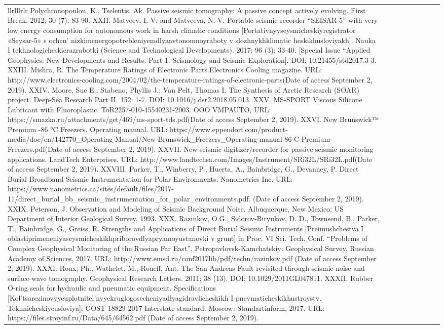 \begin{longtable}{lllllllll}{llrlllrlr}
Polychronopoulou, K., Tselentis, Ak. Passive seismic tomography: A passive concept actively evolving. First Break. 2012; 30 (7): 83-90. XXII. Matveev, I. V. and Matveeva, N. V. Portable seismic recorder “SEISAR-5” with very low energy consumption for autonomous work in harsh climatic conditions [Portativnyyseysmicheskiyregistrator «Seysar-5» s ochen’ nizkimenergopotrebleniyemdlyaavtonomnoyraboty v slozhnykhklimatic heskikhusloviyakh]. Nauka I tekhnologicheskierazrabotki (Science and Technological Developments). 2017; 96 (3): 33-40. [Special Issue “Applied Geophysics: New Developments and Results. Part 1. Seismology and Seismic Exploration]. DOI: 10.21455/std2017.3-3.  XXIII. Mishra, R. The Temperature Ratings of Electronic Parts.Electronics Cooling magazine. URL: http://www.electronics-cooling.com/2004/02/the-temperature-ratings-of-electronic-parts(Date of access September 2, 2019).  XXIV. Moore, Sue E.; Stabeno, Phyllis J.; Van Pelt, Thomas I. The Synthesis of Arctic Research (SOAR) project. Deep-Sea Research Part II. 152: 1-7. DOI: 10.1016/j.dsr2.2018.05.013.  XXV. MS-SPORT Viscous Silicone Lubricant with Fluoroplastic. ToR2257-010-45540231-2003. OOO VMPAUTO, URL: https://smazka.ru/attachments/get/469/ms-sport-tds.pdf(Date of access September 2, 2019).  XXVI. New Brunswick™ Premium -86 °C Freezers. Operating manual. URL: https://www.eppendorf.com/product-media/doc/en/142770_Operating-Manual/New-Brunswick_Freezers_Operating-manual-86-C-Premium-Freezers.pdf(Date of access September 2, 2019).  XXVII. New seismic digitizer/recorder for passive seismic monitoring applications. LandTech Enterprises. URL: http://www.landtechsa.com/Images/Instrument/SRi32L/SRi32L.pdf(Date of access September 2, 2019).  XXVIII. Parker, T., Winberry, P., Huerta, A., Bainbridge, G., Devanney, P. Direct Burial Broadband Seismic Instrumentation for Polar Environments. Nanometrics Inc. URL: https://www.nanometrics.ca/sites/default/files/2017-11/direct_burial_bb_seismic_instrumentation_for_polar_environments.pdf. (Date of access September 2, 2019).  XXIX. Peterson, J. Observation and Modeling of Seismic Background Noise. Albuquerque, New Mexico: US Department of Interior Geological Survey, 1993.  XXX. Razinkov, O.G., Sidorov-Biryukov, D. D., Townsend, B., Parker, T., Bainbridge, G., Greiss, R. Strengths and Applications of Direct Burial Seismic Instruments [Preimushchestva I oblastiprimeneniyaseysmicheskikhpriborovdlyapryamoyustanovki v grunt] in Proc. VI Sci. Tech. Conf. “Problems of Complex Geophysical Monitoring of the Russian Far East”, Petropavlovsk-Kamchatskiy: Geophysical Survey, Russian Academy of Sciences, 2017. URL: http://www.emsd.ru/conf2017lib/pdf/techn/razinkov.pdf (Date of access September 2, 2019).  XXXI. Roux, Ph., Wathelet, M., Roueff, Ant. The San Andreas Fault revisited through seismic-noise and surface-wave tomography. Geophysical Research Letters. 2011; 38 (13). DOI: 10.1029/2011GL047811.  XXXII. Rubber O-ring seals for hydraulic and pneumatic equipment. Specifications [Kol’tsarezinovyyeuplotnitel’nyyekruglogosecheniyadlyagidravlicheskikh I pnevmaticheskikhustroystv. Tekhnicheskiyeusloviya]. GOST 18829-2017 Interstate standard. Moscow: Standartinform, 2017. URL: https://files.stroyinf.ru/Data/645/64562.pdf (Date of access September 2, 2019).  
\end{longtable}
